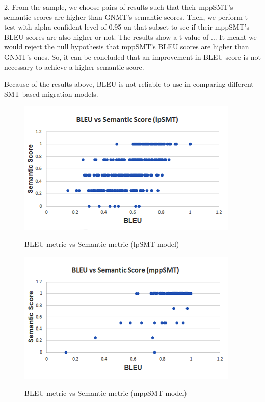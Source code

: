 2.  From the sample, we choose pairs of results such that their mppSMT's semantic scores are higher than GNMT's semantic scores. Then, we perform t-test with alpha confident level of 0.95 on that subset to see if their mppSMT's BLEU scores are also higher or not. The results show a t-value of ... It meant we would reject the null hypothesis that mppSMT's BLEU scores are higher than GNMT's ones. So, it can be concluded that an improvement in BLEU score is not necessary to achieve a higher semantic score. 

Because of the results above, BLEU is not reliable to use in comparing different SMT-based migration models. 

\begin{figure}
\caption{BLEU metric vs Semantic metric (lpSMT model)}
\centering
\includegraphics{img/bleuvssemantic_lpSMT.png}
\label{fig:BleuSemlpSMT}
\end{figure}

\begin{figure}
\caption{BLEU metric vs Semantic metric (mppSMT model)}
\centering
\includegraphics{img/bleuvssemantic_mppSMT.png}
\label{fig:BleuSemMppSMT}
\end{figure}

